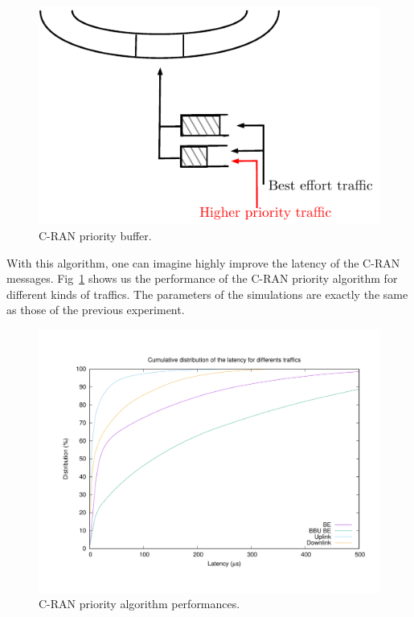 \documentclass[a4paper,10pt,french,english]{article}
\begin{document}
    \begin{figure}[h]
\begin{center}   
      \includegraphics[scale=0.7]{insertion1.pdf}
     \caption{C-RAN priority buffer.}
\end{center}
  \end{figure}
  
  With this algorithm, one can imagine highly improve the latency of the C-RAN messages. Fig~\ref{fig:prior} shows us the performance of the C-RAN priority algorithm for different kinds of traffics. The parameters of the simulations are exactly the same as those of the previous experiment.
  
      \begin{figure}[h]
      \label{fig:prior}
\begin{center}   

      \includegraphics[scale=0.4]{prior.pdf}

     \caption{C-RAN priority algorithm performances.}
\end{center}
  \end{figure}
  
\end{document}
